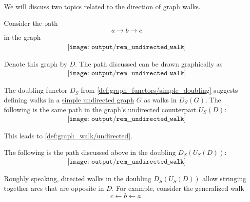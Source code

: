 \begin{remark}\label{rem:undirected_walks}
  We will discuss two topics related to the direction of graph walks.

  Consider the path
  \begin{equation*}
    a \to b \to c
  \end{equation*}
  in the graph
  \begin{equation*}
    \begin{aligned}
      \texttt{[image: output/rem\_\_undirected\_walk]}
    \end{aligned}
  \end{equation*}

  Denote this graph by \( D \). The path discussed can be drawn graphically as
  \begin{equation*}
    \begin{aligned}
      \texttt{[image: output/rem\_\_undirected\_walk]}
    \end{aligned}
  \end{equation*}

  The doubling functor \( D_S \) from \cref{def:graph_functors/simple_doubling} suggests defining walks in a \hyperref[def:undirected_graph]{simple undirected graph} \( G \) as walks in \( D_S(G) \). The following is the same path in the graph's undirected counterpart \hyperref[def:graph_functors/simple_forgetful]{\( U_S(D) \)}:
  \begin{equation*}
    \begin{aligned}
      \texttt{[image: output/rem\_\_undirected\_walk]}
    \end{aligned}
  \end{equation*}

  This leads to \cref{def:graph_walk/undirected}.

  The following is the path discussed above in the doubling \( D_S(U_S(D)) \):
  \begin{equation*}
    \begin{aligned}
      \texttt{[image: output/rem\_\_undirected\_walk]}
    \end{aligned}
  \end{equation*}

  Roughly speaking, directed walks in the doubling \( D_S(U_S(D)) \) allow stringing together arcs that are opposite in \( D \). For example, consider the generalized walk
  \begin{equation}\label{eq:def:graph_walk/generalized/example}
    c \leftarrow b \leftarrow a.
  \end{equation}


\end{remark}
